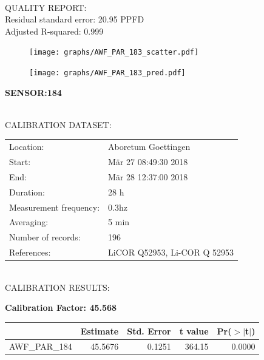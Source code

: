 \documentclass[oneside]{report}
\begin{document}
\hrulefill\\
QUALITY REPORT:\\
Residual standard error: 20.95 PPFD\\
Adjusted R-squared: 0.999



\begin{figure}[H]
  \centering
  \texttt{[image: graphs/AWF\_PAR\_183\_scatter.pdf]}
\end{figure}




\begin{figure}[H]
  \centering
  \texttt{[image: graphs/AWF\_PAR\_183\_pred.pdf]}
\end{figure}

\pagebreak


\begin{center}
\large{\textbf{SENSOR:184}}\\
\end{center}

\hrulefill\\
CALIBRATION DATASET:\\
\begin{table}[h!]
  \centering
  \label{tab:table1}
  \begin{tabular}{ll}
    Location: & Aboretum Goettingen\\ 
    
    
    Start:  & Mär 27 08:49:30 2018 \\
    End:   & Mär 28 12:37:00 2018\\ 
    Duration: & 28 h\\
    Measurement frequency: & 0.3hz\\
    Averaging:  &5 min\\
    Number of records: & 196 \\
    References: & LiCOR Q52953, Li-COR Q 52953 \\
  \end{tabular}
\end{table}

\hrulefill\\
CALIBRATION RESULTS:\\


\begin{center}
\textbf{\large{Calibration Factor: 45.568}}\\
\end{center}
\begin{table}[ht]
\centering
\begin{tabular}{rrrrr}
  \hline
 & Estimate & Std. Error & t value & Pr($>$$|$t$|$) \\ 
  \hline
AWF\_PAR\_184 & 45.5676 & 0.1251 & 364.15 & 0.0000 \\ 
   \hline
\end{tabular}
\end{table}
\end{document}
